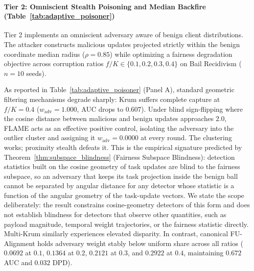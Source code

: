 

\paragraph{Tier 2: Omniscient Stealth Poisoning and Median Backfire (Table~\ref{tab:adaptive_poisoner})}
Tier 2 implements an omniscient adversary aware of benign client distributions. The attacker constructs malicious updates projected strictly within the benign coordinate median radius ($\rho = 0.85$) while optimizing a fairness degradation objective across corruption ratios $f/K \in \{0.1, 0.2, 0.3, 0.4\}$ on Bail Recidivism ($n=10$ seeds).

As reported in Table~\ref{tab:adaptive_poisoner} (Panel A), standard geometric filtering mechanisms degrade sharply: Krum suffers complete capture at $f/K=0.4$ ($w_{\mathrm{adv}} = 1.000$, AUC drops to $0.607$). Under blind sign-flipping where the cosine distance between malicious and benign updates approaches $2.0$, FLAME acts as an effective positive control, isolating the adversary into the outlier cluster and assigning it $w_{\mathrm{adv}} = 0.0000$ at every round. The clustering works; proximity stealth defeats it. This is the empirical signature predicted by Theorem~\ref{thm:subspace_blindness} (Fairness Subspace Blindness): detection statistics built on the cosine geometry of task updates are blind to the fairness subspace, so an adversary that keeps its task projection inside the benign ball cannot be separated by angular distance for any detector whose statistic is a function of the angular geometry of the task-update vectors. We state the scope deliberately: the result constrains cosine-geometry detectors of this form and does not establish blindness for detectors that observe other quantities, such as payload magnitude, temporal weight trajectories, or the fairness statistic directly. Multi-Krum similarly experiences elevated disparity. In contrast, canonical FU-Alignment holds adversary weight stably below uniform share across all ratios ($0.0692$ at $0.1$, $0.1364$ at $0.2$, $0.2121$ at $0.3$, and $0.2922$ at $0.4$, maintaining $0.672$ AUC and $0.032$ DPD).

